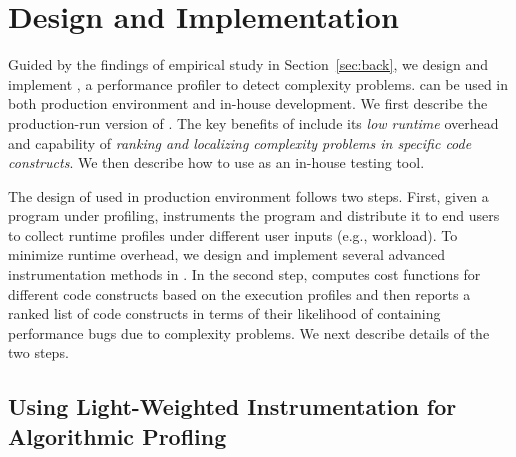 \section{\Tool Design and Implementation}
\label{sec:online}


Guided by the findings of empirical study in Section~\ref{sec:back},
we design and implement \Tool, a performance 
profiler to detect complexity problems. \Tool
can be used in both production environment 
and in-house development. We first describe
the production-run version of \Tool. 
The key benefits of \Tool include its \emph{low runtime} 
overhead and capability of \emph{ranking 
and localizing complexity problems in specific code constructs}. 
We then describe how to use \Tool as an in-house testing tool. 

The design of \Tool used in production environment 
follows two steps. First, given a program under profiling,
\Tool instruments the program and
distribute it to end users to collect runtime profiles
under different user inputs (e.g., workload). 
To minimize runtime overhead, we design and implement
several advanced instrumentation methods in \Tool. 
In the second step, \Tool computes cost functions for
different code constructs based on the execution profiles
and then reports a ranked list of code constructs in
terms of their likelihood of containing performance bugs due to
complexity problems.  We next describe details of the two steps. 


\subsection{Using Light-Weighted Instrumentation 
for Algorithmic Profling}


